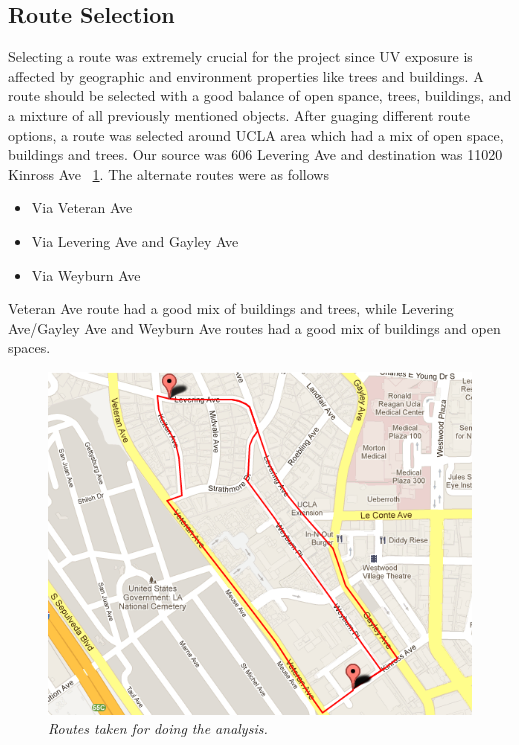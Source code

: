\documentclass[10pt]{sigplan-proc-varsize}
\begin{document}
\subsection{Route Selection}
Selecting a route was extremely crucial for the project since UV exposure is affected by geographic and environment properties like trees and buildings. A route should be selected with a good balance of open spance, trees, buildings, and a mixture of all previously mentioned objects. After guaging different route options, a route was selected around UCLA area which had a mix of open space, buildings and trees.  Our source was 606 Levering Ave and destination was 11020 Kinross Ave ~\ref{fig:Route}.  The alternate routes were as follows
 \begin{itemize}
\item  Via Veteran Ave 
\item Via Levering Ave and Gayley Ave
\item Via Weyburn Ave
 \end{itemize}
Veteran Ave route had a good mix of buildings and trees, while Levering Ave/Gayley Ave and Weyburn Ave routes had a good mix of buildings and open spaces. 
\begin{figure}  
\begin{center}  
\includegraphics[scale=0.4]{allRoutes.png}
\caption{\small \sl Routes taken for doing the analysis.\label{fig:Route}}  
\end{center}  
\end{figure} 
\end{document}
